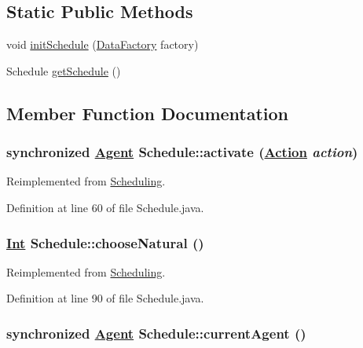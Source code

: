 \subsection*{Static Public Methods}
\begin{CompactItemize}
\item 
void \hyperlink{classSchedule_d0}{init\-Schedule} (\hyperlink{interfaceDataFactory}{Data\-Factory} factory)
\item 
Schedule \hyperlink{classSchedule_d1}{get\-Schedule} ()
\end{CompactItemize}


\subsection{Member Function Documentation}
\hypertarget{classSchedule_a2}{
\subsubsection[activate]{\setlength{\rightskip}{0pt plus 5cm}synchronized \hyperlink{interfaceAgent}{Agent} Schedule::activate (\hyperlink{interfaceAction}{Action} {\em action})}}
\label{classSchedule_a2}




Reimplemented from \hyperlink{interfaceScheduling_a2}{Scheduling}.

Definition at line 60 of file Schedule.java.\hypertarget{classSchedule_a6}{
\subsubsection[chooseNatural]{\setlength{\rightskip}{0pt plus 5cm}\hyperlink{interfaceInt}{Int} Schedule::choose\-Natural ()}}
\label{classSchedule_a6}




Reimplemented from \hyperlink{interfaceScheduling_a6}{Scheduling}.

Definition at line 90 of file Schedule.java.\hypertarget{classSchedule_a4}{
\subsubsection[currentAgent]{\setlength{\rightskip}{0pt plus 5cm}synchronized \hyperlink{interfaceAgent}{Agent} Schedule::current\-Agent ()}}
\label{classSchedule_a4}




